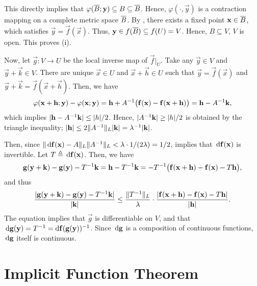 \documentclass[../MAS242_Note.tex]{subfiles}
\begin{document}
{    This directly implies that \(\varphi(\cl B; \vec y) \subseteq B \subseteq \cl B\).
    Hence, \(\varphi(\cdot, \vec y)\) is a contraction mapping on a complete metric space \(\cl B\).
    By , there exists a fixed point \(\vec x \in \cl B\),
    which satisfies \(\vec y = \vec f(\vec x)\).
    Thus, \(\vec y \in f(\cl B) \subseteq f(U) = V\).
    Hence, \(B \subseteq V\), \(V\) is open. This proves (i).

    Now, let \(\vec g \colon V \to U\) be the local inverse map of \(\vec f \big|_U\).
    Take any \(\vec y \in V\) and \(\vec y + \vec k \in V\).
    There are unique \(\vec x \in U\) and \(\vec x + \vec h \in U\) such that
    \(\vec y = \vec f(\vec x)\) and \(\vec y + \vec k = \vec f(\vec x + \vec h)\).
    Then, we have
    \[
        \varphi(\vec x + \vec h; \vec y) - \varphi(\vec x; \vec y)
        = \vec h + A\inv \big(\vec f(\vec x) - \vec f(\vec x + \vec h)\big)
        = \vec h - A\inv\vec k\text{,}
    \]
    which implies \(|\vec h-A\inv\vec k| \le |h| / 2\).
    Hence, \(|A\inv \vec k| \ge |h| / 2\) is obtained by the triangle inequality;
    \(|\vec h| \le 2 \|A\inv\|_L |\vec k| = \lambda\inv |\vec k|\).

    Then, since \(\|\d\vec f(\vec x) - A\|_L \|A\inv\|_L < \lambda \cdot 1/(2\lambda) = 1/2\),
     implies that \(\d\vec f(\vec x)\) is invertible.
    Let \(T \triangleq \d\vec f(\vec x)\).
    Then, we have \[
        \vec g(\vec y + \vec k) - \vec g(\vec y) - T\inv\vec k
        = \vec h - T\inv\vec k
        = -T\inv \big( \vec f(\vec x + \vec h) - \vec f(\vec x) - T\vec h \big),
    \]
    and thus
    \[
        \frac{|\vec g(\vec y + \vec k) - \vec g(\vec y) - T\inv\vec k|}{|\vec k|}
        \le \frac{\|T\inv\|_L}{\lambda} \cdot \frac{|\vec f(\vec x + \vec h) - \vec f(\vec x) - T\vec h|}{|\vec h|}.
    \]
    The equation implies that \(\vec g\) is differentiable on \(V\),
    and that \(\d\vec g(\vec y) = T\inv = \mrm d\vec f(\vec g(\vec y))\inv\).
    Since \(\d\vec g\) is a composition of continuous functions,
    \(\d\vec g\) itself is continuous.
}


\section{Implicit Function Theorem}
\end{document}
